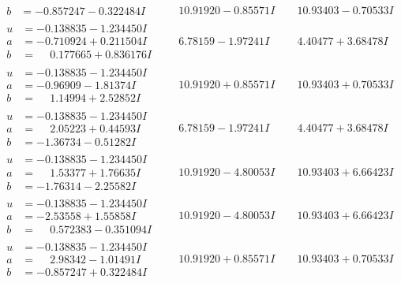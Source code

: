 \documentclass[1p]{elsarticle_modified}
\theoremstyle{definition}
\begin{document}
$$\begin{array}{c|c|c}
\begin{aligned}
b &= -0.857247 - 0.322484 I\end{aligned}
 & \phantom{-}10.91920 - 0.85571 I & \phantom{-}10.93403 - 0.70533 I \\ \hline\begin{aligned}
u &= -0.138835 - 1.234450 I \\
a &= -0.710924 + 0.211504 I \\
b &= \phantom{-}0.177665 + 0.836176 I\end{aligned}
 & \phantom{-}6.78159 - 1.97241 I & \phantom{-}4.40477 + 3.68478 I \\ \hline\begin{aligned}
u &= -0.138835 - 1.234450 I \\
a &= -0.96909 - 1.81374 I \\
b &= \phantom{-}1.14994 + 2.52852 I\end{aligned}
 & \phantom{-}10.91920 + 0.85571 I & \phantom{-}10.93403 + 0.70533 I \\ \hline\begin{aligned}
u &= -0.138835 - 1.234450 I \\
a &= \phantom{-}2.05223 + 0.44593 I \\
b &= -1.36734 - 0.51282 I\end{aligned}
 & \phantom{-}6.78159 - 1.97241 I & \phantom{-}4.40477 + 3.68478 I \\ \hline\begin{aligned}
u &= -0.138835 - 1.234450 I \\
a &= \phantom{-}1.53377 + 1.76635 I \\
b &= -1.76314 - 2.25582 I\end{aligned}
 & \phantom{-}10.91920 - 4.80053 I & \phantom{-}10.93403 + 6.66423 I \\ \hline\begin{aligned}
u &= -0.138835 - 1.234450 I \\
a &= -2.53558 + 1.55858 I \\
b &= \phantom{-}0.572383 - 0.351094 I\end{aligned}
 & \phantom{-}10.91920 - 4.80053 I & \phantom{-}10.93403 + 6.66423 I \\ \hline\begin{aligned}
u &= -0.138835 - 1.234450 I \\
a &= \phantom{-}2.98342 - 1.01491 I \\
b &= -0.857247 + 0.322484 I\end{aligned}
 & \phantom{-}10.91920 + 0.85571 I & \phantom{-}10.93403 + 0.70533 I \\ \hline\begin{aligned}

\end{aligned}
\end{array}$$
\end{document}
